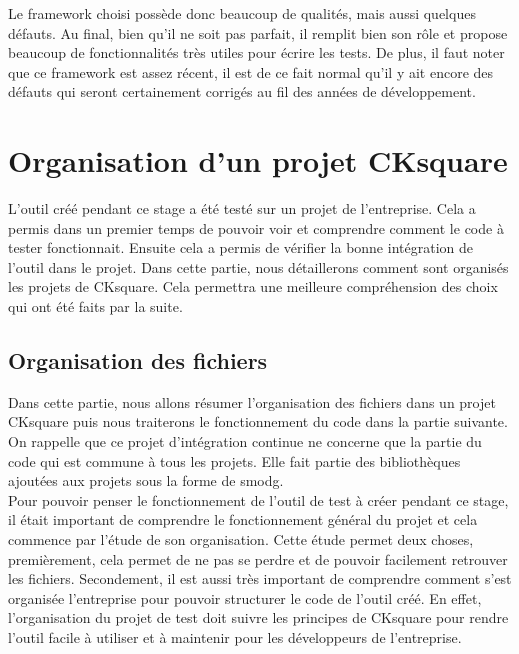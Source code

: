 \documentclass[a4paper]{article}
\begin{document}
Le framework choisi possède donc beaucoup de qualités, mais aussi quelques
défauts. Au final, bien qu'il ne soit pas parfait, il remplit bien son rôle et
propose beaucoup de fonctionnalités très utiles pour écrire les tests. De
plus, il faut noter que ce framework est assez récent, il est de ce fait normal
qu'il y ait encore des défauts qui seront certainement corrigés au fil des
années de développement.
\section{Organisation d'un projet CKsquare}%

L'outil créé pendant ce stage a été testé sur un projet de l'entreprise. Cela a
permis dans un premier temps de pouvoir voir et comprendre comment le code à
tester fonctionnait. Ensuite cela a permis de vérifier la bonne intégration de
l'outil dans le projet. Dans cette partie, nous détaillerons comment sont
organisés les projets de CKsquare. Cela permettra une meilleure compréhension des
choix qui ont été faits par la suite.

\subsection{Organisation des fichiers}
\label{orgaprojck}

Dans cette partie, nous allons résumer l'organisation des fichiers dans un
projet CKsquare puis nous traiterons le fonctionnement du code dans la partie
suivante. On rappelle que ce projet d'intégration continue ne concerne que la
partie du code qui est commune à tous les projets. Elle fait partie des
bibliothèques ajoutées aux projets sous la forme de \gls{smodg}. \\

Pour pouvoir penser le fonctionnement de l'outil de test à créer pendant ce
stage, il était important de comprendre le fonctionnement général du projet et
cela commence par l'étude de son organisation. Cette étude permet deux choses,
premièrement, cela permet de ne pas se perdre et de pouvoir facilement retrouver
les fichiers. Secondement, il est aussi très important de comprendre comment
s'est organisée l'entreprise pour pouvoir structurer le code de l'outil créé. En
effet, l'organisation du projet de test doit suivre les principes de CKsquare
pour rendre l'outil facile à utiliser et à maintenir pour les développeurs de
l'entreprise.
\end{document}

